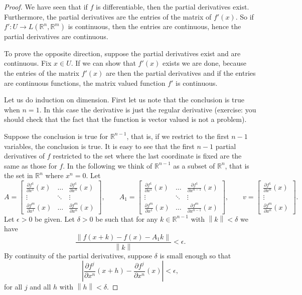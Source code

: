 \documentclass[12pt]{book}
\newcommand{\abs}[1]{\left\lvert {#1} \right\rvert}
\newcommand{\norm}[1]{\left\lVert {#1} \right\rVert}
\newcommand{\R}{{\mathbb{R}}}
\theoremstyle{plain}
\theoremstyle{remark}
\theoremstyle{definition}
\theoremstyle{exercise}
\theoremstyle{example}
\begin{document}
\begin{proof}
We have seen that if $f$ is differentiable, then
the partial derivatives exist.  Furthermore, the partial
derivatives are the entries of the matrix of $f'(x)$.  So if
$f' \colon U \to L(\R^n,\R^m)$ is continuous, then the entries are
continuous, hence the partial derivatives are continuous.

To prove the opposite direction,
suppose the partial derivatives exist and are continuous.
Fix $x \in U$.  If we can show that $f'(x)$ exists we are done, because
the entries of the matrix $f'(x)$ are then the partial derivatives and if
the entries are continuous functions, the matrix valued function $f'$ is
continuous.

Let us do induction on dimension.  First let us note that
the conclusion is true when $n=1$.  In this case the derivative
is just the regular derivative (exercise: you should check that the fact
that the function is vector valued is not a problem).

Suppose the conclusion is true for $\R^{n-1}$,
that is,
if we restrict to the first $n-1$ variables, the conclusion is true.
It is easy to see that the first $n-1$
partial derivatives of $f$ restricted to the set where the last coordinate is
fixed are the same as those for $f$.
In the following
we think of $\R^{n-1}$ as a subset of $\R^n$, that is the set in $\R^n$ where $x^n = 0$.
Let
\begin{equation*}
A = 
\begin{bmatrix}
\frac{\partial f^1}{\partial x^1}(x)
& \ldots &
\frac{\partial f^1}{\partial x^n}(x)
\\
\vdots & \ddots & \vdots
\\
\frac{\partial f^m}{\partial x^1}(x)
& \ldots &
\frac{\partial f^m}{\partial x^n}(x)
\end{bmatrix} ,
\qquad
A_1 = 
\begin{bmatrix}
\frac{\partial f^1}{\partial x^1}(x)
& \ldots &
\frac{\partial f^1}{\partial x^{n-1}}(x)
\\
\vdots & \ddots & \vdots
\\
\frac{\partial f^m}{\partial x^1}(x)
& \ldots &
\frac{\partial f^m}{\partial x^{n-1}}(x)
\end{bmatrix} ,
\qquad
v = 
\begin{bmatrix}
\frac{\partial f^1}{\partial x^n}(x)
\\
\vdots
\\
\frac{\partial f^m}{\partial x^n}(x)
\end{bmatrix} .
\end{equation*}
Let $\epsilon > 0$ be given.  Let $\delta > 0$ be such that
for any $k \in \R^{n-1}$ with $\norm{k} < \delta$ we have
\begin{equation*}
\frac{\norm{f(x+k) - f(x) - A_1k}}{\norm{k}} < \epsilon .
\end{equation*}
By continuity of the partial derivatives, suppose $\delta$ is small
enough so that
\begin{equation*}
\abs{\frac{\partial f^j}{\partial x^n}(x+h)
      - \frac{\partial f^j}{\partial x^n}(x)} < \epsilon ,
\end{equation*}
for all $j$ and all $h$ with $\norm{h} < \delta$.


\end{proof}
\end{document}
